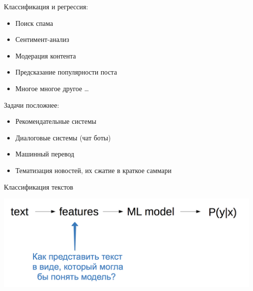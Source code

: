 \documentclass[notes,12pt, aspectratio=169]{beamer}
\begin{document}
\begin{frame}
\begin{block}{Классификация и регрессия:}
	\begin{itemize}
	\item Поиск спама
	\item Сентимент-анализ
	\item Модерация контента
	\item Предсказание популярности поста 
	\item Многое многое другое \ldots 
\end{itemize}
\end{block}

\begin{block}{Задачи посложнее:}
	\begin{itemize}
		\item Рекомендательные системы
		\item Диалоговые системы (чат боты)
		\item Машинный перевод 
		\item Тематизация новостей, их сжатие в краткое саммари
	\end{itemize}
\end{block}
\end{frame} 


\begin{frame}{Классификация текстов}
\begin{center}
	\includegraphics[width=.8\linewidth]{text1.png}
\end{center}
\end{frame} 
\end{document}
